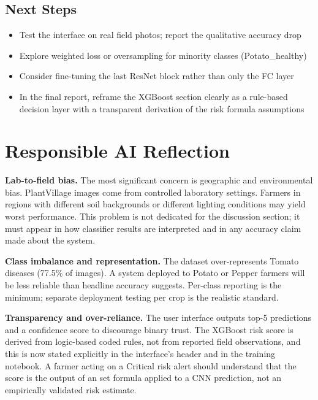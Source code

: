 \documentclass[conference]{IEEEtran}
\begin{document}
\subsection{Next Steps}
\begin{itemize}[noitemsep]
  \item Test the interface on real field photos; report the qualitative accuracy drop
  \item Explore weighted loss or oversampling for minority classes (Potato\_healthy)
  \item Consider fine-tuning the last ResNet block rather than only the FC layer
  \item In the final report, reframe the XGBoost section clearly as a rule-based decision layer with a transparent derivation of the risk formula assumptions
\end{itemize}

\section{Responsible AI Reflection}

\textbf{Lab-to-field bias.} The most significant concern is geographic and environmental bias. PlantVillage images come from controlled laboratory settings. Farmers in regions with different soil backgrounds or different lighting conditions may yield worst performance. This problem is not dedicated for the discussion section; it must appear in how classifier results are interpreted and in any accuracy claim made about the system.

\textbf{Class imbalance and representation.} The dataset over-represents Tomato diseases (77.5\% of images). A system deployed to Potato or Pepper farmers will be less reliable than headline accuracy suggests. Per-class reporting is the minimum; separate deployment testing per crop is the realistic standard.

\textbf{Transparency and over-reliance.} The user interface outputs top-5 predictions and a confidence score to discourage binary trust. The XGBoost risk score is derived from logic-based coded rules, not from reported field observations, and this is now stated explicitly in the interface's header and in the training notebook. A farmer acting on a Critical risk alert should understand that the score is the output of an set formula applied to a CNN prediction, not an empirically validated risk estimate.
\end{document}
